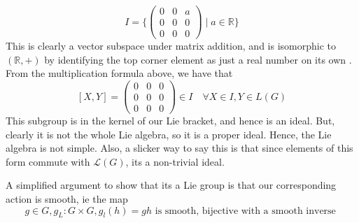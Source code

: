 \documentclass[11pt, oneside]{article}   	%
\theoremstyle{slanted}
\begin{document}
\[ 
I = \bigg \{  \begin{pmatrix} 0  & 0 & a \\ 0 & 0 & 0 \\ 0 & 0 & 0 \end{pmatrix} \mid a \in \mathbb{ R} \bigg \} 
\] This is clearly a vector subspace under matrix addition, and is isomorphic 
to $ ( \mathbb { R } , + ) $ by identifying the top corner element as just a real number on its own
. From the multiplication formula above, we have that 
\[ [ X, Y ]  = \begin{pmatrix} 0 & 0 & 0 \\ 0 & 0 & 0 \\ 0 & 0 & 0 \end{pmatrix} \in I  \quad \forall X \in I, Y \in L ( G ) \] 
This subgroup is in the kernel of our Lie bracket, and hence is an ideal. But, clearly it is not the whole Lie algebra,
so it is a proper ideal. Hence, the Lie algebra is not simple. 
Also, a slicker way to say this
is that since elements of this form commute with $ \mathcal{ L } ( G ) $, 
its a non-trivial ideal. 

A simplified argument to show that 
its a Lie group is that our corresponding 
action is smooth, ie the map 
\[
 g \in G, g_L : G \times G, g_l ( h ) = gh \text{ is smooth, bijective with a smooth inverse }
\] 
\pagebreak 
\end{document}
